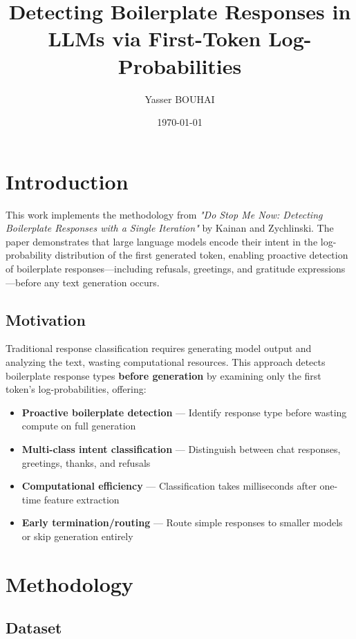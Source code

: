 \documentclass[11pt]{article}
\title{\textbf{Detecting Boilerplate Responses in LLMs via First-Token Log-Probabilities}}
\author{Yasser BOUHAI}
\date{\today}
\begin{document}
\maketitle

\section{Introduction}

This work implements the methodology from \textit{"Do Stop Me Now: Detecting Boilerplate Responses with a Single Iteration"} by Kainan and Zychlinski. The paper demonstrates that large language models encode their intent in the log-probability distribution of the first generated token, enabling proactive detection of boilerplate responses—including refusals, greetings, and gratitude expressions—before any text generation occurs.

\subsection{Motivation}

Traditional response classification requires generating model output and analyzing the text, wasting computational resources. This approach detects boilerplate response types \textbf{before generation} by examining only the first token's log-probabilities, offering:

\begin{itemize}
    \item \textbf{Proactive boilerplate detection} --- Identify response type before wasting compute on full generation
    \item \textbf{Multi-class intent classification} --- Distinguish between chat responses, greetings, thanks, and refusals
    \item \textbf{Computational efficiency} --- Classification takes milliseconds after one-time feature extraction
    \item \textbf{Early termination/routing} --- Route simple responses to smaller models or skip generation entirely
\end{itemize}

\section{Methodology}

\subsection{Dataset}
\end{document}
